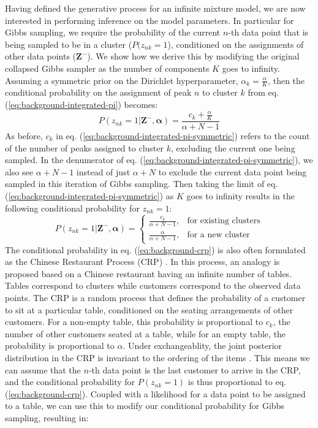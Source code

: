 Having defined the generative process for an infinite mixture model, we are now interested in performing inference on the model parameters. In particular for Gibbs sampling, we require the probability of the current $n$-th data point that is being sampled to be in a cluster ($P(z_{nk}=1$), conditioned on the assignments of other data points ($\boldsymbol{Z}^{-}$). We show how we derive this by modifying the original collapsed Gibbs sampler as the number of components $K$ goes to infinity. Assuming a symmetric prior on the Dirichlet hyperparameter, $\alpha_k=\frac{\alpha}{K}$, then the conditional probability on the assignment of peak $n$ to cluster $k$ from eq. (\ref{eq:background-integrated-pi}) becomes:
\begin{equation}
P(z_{nk}=1 \vert \boldsymbol{Z}^{-}, \boldsymbol{\alpha}) = \frac{c_k + \frac{\alpha}{K}}{\alpha+N-1}
\label{eq:background-integrated-pi-symmetric}
\end{equation}
As before, $c_k$ in eq. (\ref{eq:background-integrated-pi-symmetric}) refers to the count of the number of peaks assigned to cluster $k$, excluding the current one being sampled. In the denumerator of eq. (\ref{eq:background-integrated-pi-symmetric}), we also see $\alpha+N-1$ instead of just $\alpha+N$ to exclude the current data point being sampled in this iteration of Gibbs sampling. Then taking the limit of eq. (\ref{eq:background-integrated-pi-symmetric}) as $K$ goes to infinity results in the following conditional probability for $z_{nk}=1$:
\begin{equation}
P(z_{nk}=1 \vert \boldsymbol{Z}^{-}, \boldsymbol{\alpha}) = 
\begin{cases}
    \frac{c_k}{\alpha+N-1}, & \text{for existing clusters} \\
    \frac{\alpha}{\alpha+N-1}, & \text{for a new cluster}
\end{cases}
\label{eq:background-crp}
\end{equation}
The conditional probability in eq. (\ref{eq:background-crp}) is also often formulated as the Chinese Restaurant Process (CRP) \cite{frigyik2010introduction}. In this process, an analogy is proposed based on a Chinese restaurant having an infinite number of tables. Tables correspond to clusters while customers correspond to the observed data points. The CRP is a random process that defines the probability of a customer to sit at a particular table, conditioned on the seating arrangements of other customers. For a non-empty table, this probability is proportional to $c_k$, the number of other customers seated at a table, while for an empty table, the probability is proportional to $\alpha$. Under exchangeablity, the joint posterior distribution in the CRP is invariant to the ordering of the items \cite{aldous1985exchangeability}. This means we can assume that the $n$-th data point is the last customer to arrive in the CRP, and the conditional probability for $P(z_{nk}=1)$ is thus proportional to eq. (\ref{eq:background-crp}). Coupled with a likelihood for a data point to be assigned to a table, we can use this to modify our conditional probability for Gibbs sampling, resulting in:
